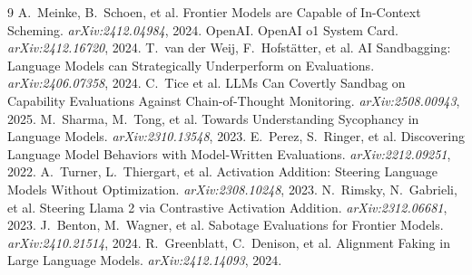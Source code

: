 \documentclass[10pt,twocolumn]{article}
\begin{document}
{\small
\begin{thebibliography}{9}
 A.~Meinke, B.~Schoen, et al. Frontier Models are Capable of
In-Context Scheming. \emph{arXiv:2412.04984}, 2024.
 OpenAI. OpenAI o1 System Card. \emph{arXiv:2412.16720}, 2024.
 T.~van der Weij, F.~Hofst\"atter, et al. AI Sandbagging:
Language Models can Strategically Underperform on Evaluations. \emph{arXiv:2406.07358}, 2024.
 C.~Tice et al. LLMs Can Covertly Sandbag on Capability Evaluations
Against Chain-of-Thought Monitoring. \emph{arXiv:2508.00943}, 2025.
 M.~Sharma, M.~Tong, et al. Towards Understanding Sycophancy in
Language Models. \emph{arXiv:2310.13548}, 2023.
 E.~Perez, S.~Ringer, et al. Discovering Language Model
Behaviors with Model-Written Evaluations. \emph{arXiv:2212.09251}, 2022.
 A.~Turner, L.~Thiergart, et al. Activation Addition: Steering
Language Models Without Optimization. \emph{arXiv:2308.10248}, 2023.
 N.~Rimsky, N.~Gabrieli, et al. Steering Llama 2 via Contrastive
Activation Addition. \emph{arXiv:2312.06681}, 2023.
 J.~Benton, M.~Wagner, et al. Sabotage Evaluations for Frontier
Models. \emph{arXiv:2410.21514}, 2024.
 R.~Greenblatt, C.~Denison, et al. Alignment Faking in Large
Language Models. \emph{arXiv:2412.14093}, 2024.
\end{thebibliography}
}
\end{document}
